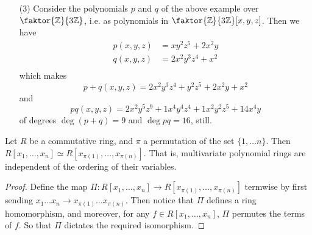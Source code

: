 \begin{example}
\begin{enumerate}
    \item[(3)] Consider the polynomials $p$ and $q$ of the above example
      over  $\faktor{\Z}{3\Z}$, i.e. as polynomials in
      $\faktor{\Z}{3\Z}[x,y,z]$. Then we have
      \begin{align*}
        p(x,y,z)    &=  xy^2z^5+2x^2y    \\
        q(x,y,z)    &=  2x^2y^3z^4+x^2  \\
      \end{align*}
      which makes
      \begin{equation*}
        p+q(x,y,z)=2x^2y^3z^4+y^2z^5+2x^2y+x^2
      \end{equation*}
      and
      \begin{equation*}
        pq(x,y,z)=2x^2y^5z^9+1x^4y^4z^4+1x^2y^2z^5+14x^4y
      \end{equation*}
      of degrees $\deg{(p+q)}=9$ and $\deg{pq}=16$, still.
  \end{enumerate}
\end{example}

\begin{proposition}\label{proposition_7.1.3}
  Let $R$ be a commutative ring, and  $\pi$ a permutation of the set  $\{1,
  \dots n\}$. Then $R[x_1, \dots, x_n] \simeq R[x_{\pi(1)}, \dots,
  x_{\pi(n)}]$. That is, multivariate polynomial rings are independent of the
  ordering of their variables.
\end{proposition}
\begin{proof}
  Define the map $\Pi:R[x_1, \dots, x_n] \xrightarrow{} R[x_{\pi(1)}, \dots,
  x_{\pi(n)}]$ termwise by first sending $x_1 \dots x_n \xrightarrow{}
  x_{\pi(1)} \dots x_{\pi(n)}$. Then notice that $\Pi$ defines a ring
  homomorphism, and moreover, for any  $f \in R[x_1, \dots, x_n]$, $\Pi$
  permutes the terms of $f$. So that  $\Pi$ dictates the required isomorphism.
\end{proof}

